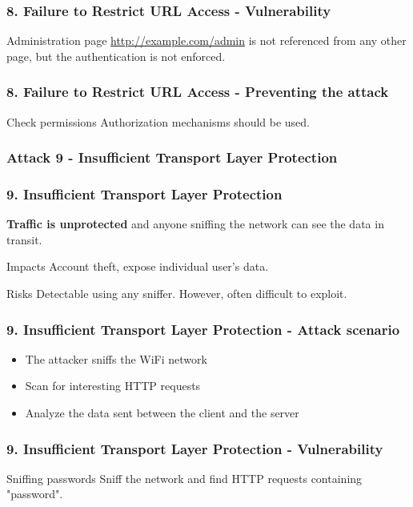 \begin{frame}
\frametitle{8. Failure to Restrict URL Access - Vulnerability}
\begin{exampleblock}{Administration page}
\url{http://example.com/admin} is not referenced from any other page, but
the authentication is not enforced.
\end{exampleblock}
\end{frame}

\begin{frame}
\frametitle{8. Failure to Restrict URL Access - Preventing the attack}
\begin{block}{Check permissions}
Authorization mechanisms should be used.
\end{block}
\end{frame}

\subsubsection{Attack 9 - Insufficient Transport Layer Protection}

\begin{frame}
\frametitle{9. Insufficient Transport Layer Protection}
\textbf{Traffic is unprotected} and anyone sniffing the network can see the
data in transit.
\begin{block}{Impacts}
Account theft, expose individual user's data.
\end{block}
\begin{block}{Risks}
\alert{Detectable} using any sniffer.
However, often difficult to exploit.
\end{block}
\end{frame}

\begin{frame}
\frametitle{9. Insufficient Transport Layer Protection - Attack scenario}
\begin{itemize}
\item The attacker sniffs the WiFi network
\item Scan for interesting HTTP requests
\item Analyze the data sent between the client and the server
\end{itemize}
\end{frame}

\begin{frame}
\frametitle{9. Insufficient Transport Layer Protection - Vulnerability}
\begin{exampleblock}{Sniffing passwords}
Sniff the network and find HTTP requests containing "password".
\end{exampleblock}
\end{frame}

